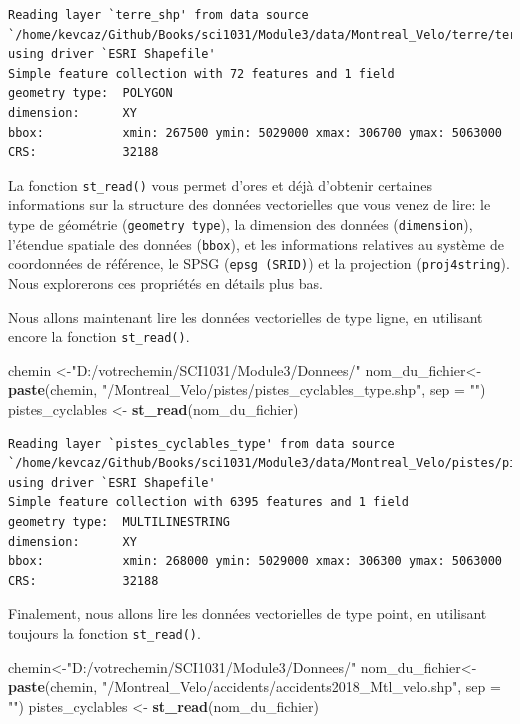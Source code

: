 \documentclass[
  12pt,
]{krantz}
\newenvironment{Shaded}{\begin{snugshade}}{\end{snugshade}}
\newcommand{\DataTypeTok}[1]{\textcolor[rgb]{0.13,0.29,0.53}{#1}}
\newcommand{\KeywordTok}[1]{\textcolor[rgb]{0.13,0.29,0.53}{\textbf{#1}}}
\newcommand{\NormalTok}[1]{#1}
\newcommand{\StringTok}[1]{\textcolor[rgb]{0.31,0.60,0.02}{#1}}
\begin{document}
\begin{verbatim}
Reading layer `terre_shp' from data source `/home/kevcaz/Github/Books/sci1031/Module3/data/Montreal_Velo/terre/terre_shp.shp' using driver `ESRI Shapefile'
Simple feature collection with 72 features and 1 field
geometry type:  POLYGON
dimension:      XY
bbox:           xmin: 267500 ymin: 5029000 xmax: 306700 ymax: 5063000
CRS:            32188
\end{verbatim}

La fonction \texttt{st\_read()} vous permet d'ores et déjà d'obtenir certaines informations sur la structure des données vectorielles que vous venez de lire: le type de géométrie (\texttt{geometry\ type}), la dimension des données (\texttt{dimension}), l'étendue spatiale des données (\texttt{bbox}), et les informations relatives au système de coordonnées de référence, le SPSG (\texttt{epsg\ (SRID)}) et la projection (\texttt{proj4string}). Nous explorerons ces propriétés en détails plus bas.

Nous allons maintenant lire les données vectorielles de type ligne, en utilisant encore la fonction \texttt{st\_read()}.

\begin{Shaded}
\begin{Highlighting}[]
\NormalTok{chemin <-}\StringTok{"D:/votrechemin/SCI1031/Module3/Donnees/"}
\NormalTok{nom_du_fichier<-}\StringTok{ }\KeywordTok{paste}\NormalTok{(chemin, }\StringTok{"/Montreal_Velo/pistes/pistes_cyclables_type.shp"}\NormalTok{, }\DataTypeTok{sep =} \StringTok{""}\NormalTok{)}
\NormalTok{pistes_cyclables <-}\StringTok{ }\KeywordTok{st_read}\NormalTok{(nom_du_fichier)}
\end{Highlighting}
\end{Shaded}

\begin{verbatim}
Reading layer `pistes_cyclables_type' from data source `/home/kevcaz/Github/Books/sci1031/Module3/data/Montreal_Velo/pistes/pistes_cyclables_type.shp' using driver `ESRI Shapefile'
Simple feature collection with 6395 features and 1 field
geometry type:  MULTILINESTRING
dimension:      XY
bbox:           xmin: 268000 ymin: 5029000 xmax: 306300 ymax: 5063000
CRS:            32188
\end{verbatim}

Finalement, nous allons lire les données vectorielles de type point, en utilisant toujours la fonction \texttt{st\_read()}.

\begin{Shaded}
\begin{Highlighting}[]
\NormalTok{chemin<-}\StringTok{"D:/votrechemin/SCI1031/Module3/Donnees/"}
\NormalTok{nom_du_fichier<-}\StringTok{ }\KeywordTok{paste}\NormalTok{(chemin, }\StringTok{"/Montreal_Velo/accidents/accidents2018_Mtl_velo.shp"}\NormalTok{, }\DataTypeTok{sep =} \StringTok{""}\NormalTok{)}
\NormalTok{pistes_cyclables <-}\StringTok{ }\KeywordTok{st_read}\NormalTok{(nom_du_fichier)}
\end{Highlighting}
\end{Shaded}
\end{document}
